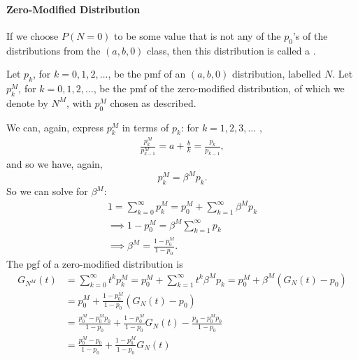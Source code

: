 \documentclass[notoc,notitlepage]{tufte-book}
\begin{document}
\paragraph{Zero-Modified Distribution}\label{para:zero_modified_distribution} If we choose $P(N = 0)$ to be some value that is not any of the $p_0$'s of the distributions from the $(a, b, 0)$ class, then this distribution is called a .

Let $p_k$, for $k = 0, 1, 2, \ldots$, be the pmf of an $(a, b, 0)$ distribution, labelled $N$. Let $p_k^M$, for $k = 0, 1, 2, \ldots$, be the pmf of the zero-modified distribution, of which we denote by $N^M$, with $p_0^M$ chosen as described.

We can, again, express $p_k^M$ in terms of $p_k$: for $k = 1, 2, 3, \ldots$ ,
\begin{align*}
  \frac{p_k^M}{p_{k - 1}^M} = a + \frac{b}{k} = \frac{p_k}{p_{k - 1}},
\end{align*}
and so we have, again,
\begin{equation*}
  p_k^M = \beta^M p_k.
\end{equation*}
So we can solve for $\beta^M$:
\begin{gather*}
  1 = \sum_{k=0}^{\infty} p_k^M = p_0^M + \sum_{k=1}^{\infty} \beta^M p_k \\
  \implies 1 - p_0^M = \beta^M \sum_{k=1}^{\infty} p_k \\
  \implies \beta^M = \frac{1 - p_0^M}{1 - p_0}.
\end{gather*}
The pgf of a zero-modified distribution is
\begin{align*}
  G_{N^M}(t) &= \sum_{k=0}^{\infty} t^k p_k^M = p_0^M + \sum_{k=1}^{\infty} t^k \beta^M p_k =  p_0^M + \beta^M ( G_N(t) - p_0 ) \\
             &= p_0^M + \frac{1 - p_0^M}{1 - p_0} ( G_N(t) - p_0 ) \\
             &= \frac{p_0^M - p_0^M p_0}{1 - p_0} + \frac{1 - p_0^M}{1 - p_0} G_N(t) - \frac{p_0 - p_0^M p_0}{1 - p_0} \\
             &= \frac{p_0^M - p_0}{1 - p_0} + \frac{1 - p_0^M}{1 - p_0} G_N(t)
\end{align*}
\end{document}
